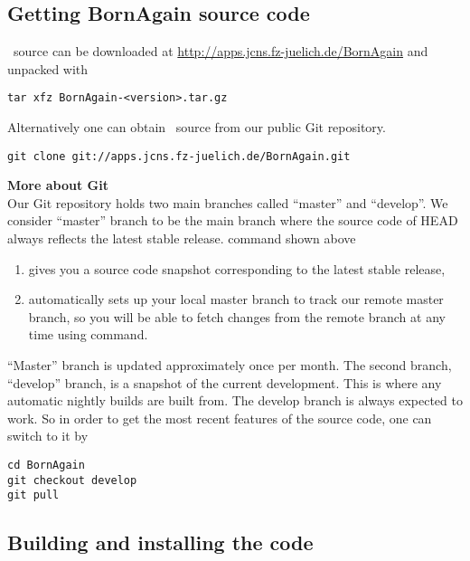 \subsection{Getting {\rm\bf BornAgain} source code}
\BornAgain\ source can be downloaded at \url{http://apps.jcns.fz-juelich.de/BornAgain}
and unpacked with
\begin{lstlisting}[language=shell, style=commandline]
tar xfz BornAgain-<version>.tar.gz
\end{lstlisting}

\noindent
Alternatively one can obtain \BornAgain\ source from our public Git repository.
\begin{lstlisting}[language=shell, style=commandline]
git clone git://apps.jcns.fz-juelich.de/BornAgain.git 
\end{lstlisting}
\vspace*{3mm}


\noindent
{\bf\large More about Git} \\
Our Git repository holds two main branches called ``master'' and ``develop''. We consider ``master''
branch to be the main branch where the source code of HEAD always
reflects the latest stable release.  command shown above
\begin{enumerate}[1.]
\item gives you a source code snapshot corresponding to the latest stable release,
\item automatically sets up your local master branch to track our remote master branch, 
so you will be able to fetch changes from the remote branch at any time using  command.
\end{enumerate}

``Master'' branch is updated approximately once per month.
The second branch, ``develop'' branch, is a snapshot of the current development.
This is where any automatic nightly builds are built from. The develop branch is
always expected to work. So in order to get the most recent features
of the source code, one can switch to it by
\begin{lstlisting}[language=shell, style=commandline]
cd BornAgain
git checkout develop
git pull
\end{lstlisting}
\vspace*{3mm}



\subsection{Building and installing the code}

